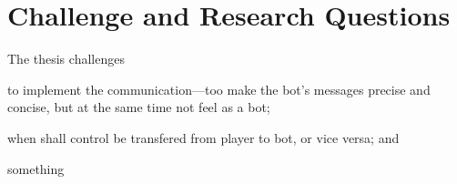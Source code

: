 \section{Challenge and Research Questions}
The thesis challenges
\begin{inparaenum}[1\upshape)]
	\item to implement the communication—too make the bot's messages precise and concise, but at the same time not
feel as a bot;
	\item when shall control be transfered from player to bot, or vice versa; and
	\item something
\end{inparaenum}